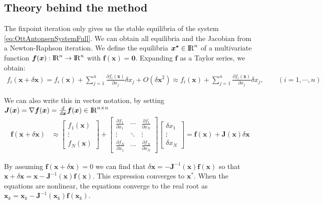 \subsection{Theory behind the method}
The fixpoint iteration only gives us the stable equilibria of the system \eqref{eq:OttAntonsenSystemFull}. We can obtain all equilibria and the Jacobian from a Newton-Raphson iteration. We define the equilibria $\boldsymbol{x^\ast} \in {\rm I\!R}^n$ of a multivariate function $\boldsymbol{f}(\boldsymbol{x}) : {\rm I\!R}^n \rightarrow {\rm I\!R}^n$ with $\boldsymbol{f}(\boldsymbol{x}) = \boldsymbol{0}$. Expanding $\boldsymbol{f}$ as a Taylor series, we obtain:
\begin{align}
f_i(\boldsymbol{x} + \delta \boldsymbol{x}) =f_{i}(\boldsymbol{x}) + \sum_{j=1}^{n} \frac{\partial f_{i}(\boldsymbol{x})}{\partial x_{j}} \delta x_{j}+O\left(\delta \boldsymbol{x}^{2}\right) \approx f_{i}(\boldsymbol{x})+\sum_{j=1}^{n} \frac{\partial f_{i}(\boldsymbol{x})}{\partial x_{j}} \delta x_{j}, \qquad(i=1, \cdots, n)
\end{align}

We can also write this in vector notation, by setting $\boldsymbol{J}(\boldsymbol{x}) = \nabla \boldsymbol{f}(\boldsymbol{x}) = \frac{d}{d\boldsymbol{x}} \boldsymbol{f}(\boldsymbol{x}) \in {\rm I\!R}^{n \times n}$ 
\begin{align}
\boldsymbol{f}(\boldsymbol{x}+\delta \boldsymbol{x}) &\approx\left[\begin{array}{c}f_{1}(\boldsymbol{x}) \\ \vdots \\ f_{N}(\boldsymbol{x})\end{array}\right] 
+ \left[\begin{array}{ccc}\frac{\partial f_{1}}{\partial x_{1}} & \cdots & \frac{\partial f_{1}}{\partial x_{N}} \\ \vdots & \ddots & \vdots \\ \frac{\partial f_{N}}{\partial x_{1}} & \cdots & \frac{\partial f_{N}}{\partial x_{N}}\end{array}\right]
\left[\begin{array}{c}\delta x_{1} \\ \vdots \\ \delta x_{N}\end{array}\right] 
=\boldsymbol{f}(\boldsymbol{x})+\boldsymbol{J}(\boldsymbol{x}) \delta \boldsymbol{x} 
\end{align}

By assuming $\boldsymbol{f}(\boldsymbol{x}+\delta \boldsymbol{x}) = 0$ we can find that $\delta \boldsymbol{x} = -\boldsymbol{J}^{-1}( \boldsymbol{x}) \boldsymbol{f}(\boldsymbol{x})$ so that $\boldsymbol{x} + \delta \boldsymbol{x} =  \boldsymbol{x} - \boldsymbol{J}^{-1} (\boldsymbol{x}) \boldsymbol{f}(\boldsymbol{x})$. This expression converges to $\boldsymbol{x^\ast}$. When the equations are nonlinear, the equations converge to the real root as $\boldsymbol{x}_k =  \boldsymbol{x}_k - \boldsymbol{J}^{-1} ( \boldsymbol{x}_k)\boldsymbol{f}(\boldsymbol{x}_k)$. \\

